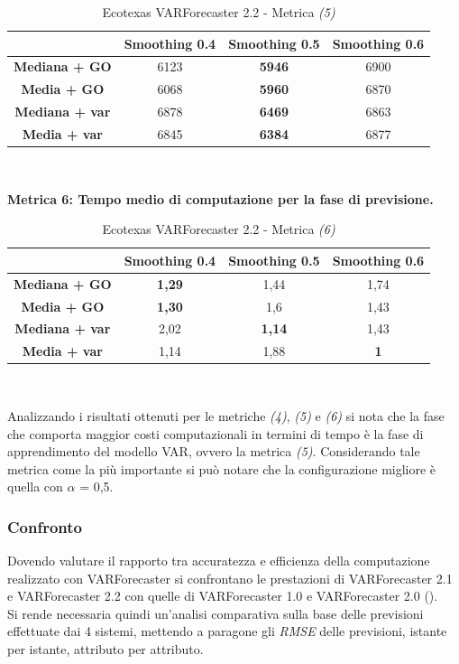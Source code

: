 \documentclass[12pt,a4paper,oneside,openright]{book}
\begin{document}
\begin{table}[H]
\centering
\begin{tabular}[H]{|c|c|c|c|}
\hline
& Smoothing 0.4 & Smoothing 0.5 & Smoothing 0.6\\
\hline
\textbf{Mediana + GO} & 6123 & \textbf{5946} & 6900\\ 
\hline
\textbf{Media + GO} & 6068 & \textbf{5960} & 6870\\ 
\hline
\textbf{Mediana + var} & 6878 & \textbf{6469} & 6863\\ 
\hline
\textbf{Media + var} & 6845 & \textbf{6384} & 6877\\ 
\hline
\end{tabular} \\
\caption{Ecotexas VARForecaster 2.2 - Metrica \textit{(5)}}
\end{table}

\medskip 
\textbf{Metrica 6: Tempo medio di computazione per la fase di previsione.}

\medskip

\begin{table}[H]
\centering
\begin{tabular}[H]{|c|c|c|c|}
\hline
& Smoothing 0.4 & Smoothing 0.5 & Smoothing 0.6\\
\hline
\textbf{Mediana + GO} & \textbf{1,29} & 1,44 & 1,74\\ 
\hline
\textbf{Media + GO} & \textbf{1,30} & 1,6 & 1,43\\ 
\hline
\textbf{Mediana + var} & 2,02 & \textbf{1,14} & 1,43\\ 
\hline
\textbf{Media + var} & 1,14 & 1,88 & \textbf{1}\\ 
\hline
\end{tabular} \\
\caption{Ecotexas VARForecaster 2.2 - Metrica \textit{(6)}}
\end{table}

Analizzando i risultati ottenuti per le metriche \textit{(4)}, \textit{(5)} e \textit{(6)} si nota che la fase che comporta maggior costi computazionali in termini di tempo è la fase di apprendimento del modello VAR, ovvero la metrica \textit{(5)}. Considerando tale metrica come la più importante si può notare che la configurazione migliore è quella con $\alpha$ = 0,5.

\newpage
\subsubsection{Confronto}
Dovendo valutare il rapporto tra accuratezza e efficienza della computazione realizzato con VARForecaster si confrontano le prestazioni di VARForecaster 2.1 e VARForecaster 2.2 con quelle di VARForecaster 1.0 e VARForecaster 2.0 (\cite{donato}). \\
Si rende necessaria quindi un'analisi comparativa sulla base delle previsioni effettuate dai 4 sistemi, mettendo a paragone gli \textit{RMSE} delle previsioni, istante per istante, attributo per attributo.
\end{document}
